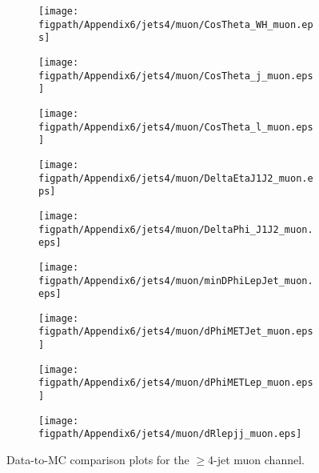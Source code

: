 \begin{figure}[!hbtp]
    \centering
    \begin{subfigure}[t]{0.317\textwidth}
        \texttt{[image: \\figpath/Appendix6/jets4/muon/CosTheta\_WH\_muon.eps]}
    \end{subfigure}
    \begin{subfigure}[t]{0.317\textwidth}
        \texttt{[image: \\figpath/Appendix6/jets4/muon/CosTheta\_j\_muon.eps]}
    \end{subfigure}
    \begin{subfigure}[t]{0.317\textwidth}
        \texttt{[image: \\figpath/Appendix6/jets4/muon/CosTheta\_l\_muon.eps]}
    \end{subfigure}

    \begin{subfigure}[t]{0.317\textwidth}
        \texttt{[image: \\figpath/Appendix6/jets4/muon/DeltaEtaJ1J2\_muon.eps]}
    \end{subfigure}
    \begin{subfigure}[t]{0.317\textwidth}
        \texttt{[image: \\figpath/Appendix6/jets4/muon/DeltaPhi\_J1J2\_muon.eps]}
    \end{subfigure}
    \begin{subfigure}[t]{0.317\textwidth}
        \texttt{[image: \\figpath/Appendix6/jets4/muon/minDPhiLepJet\_muon.eps]}
    \end{subfigure}

    \begin{subfigure}[t]{0.317\textwidth}
        \texttt{[image: \\figpath/Appendix6/jets4/muon/dPhiMETJet\_muon.eps]}
    \end{subfigure}
    \begin{subfigure}[t]{0.317\textwidth}
        \texttt{[image: \\figpath/Appendix6/jets4/muon/dPhiMETLep\_muon.eps]}
    \end{subfigure}
    \begin{subfigure}[t]{0.317\textwidth}
        \texttt{[image: \\figpath/Appendix6/jets4/muon/dRlepjj\_muon.eps]}
    \end{subfigure}
    \caption{Data-to-MC comparison plots for the $\geqslant$4-jet muon channel.}
    \label{fig:comparison_plots_jets4_muon_1}
\end{figure}

